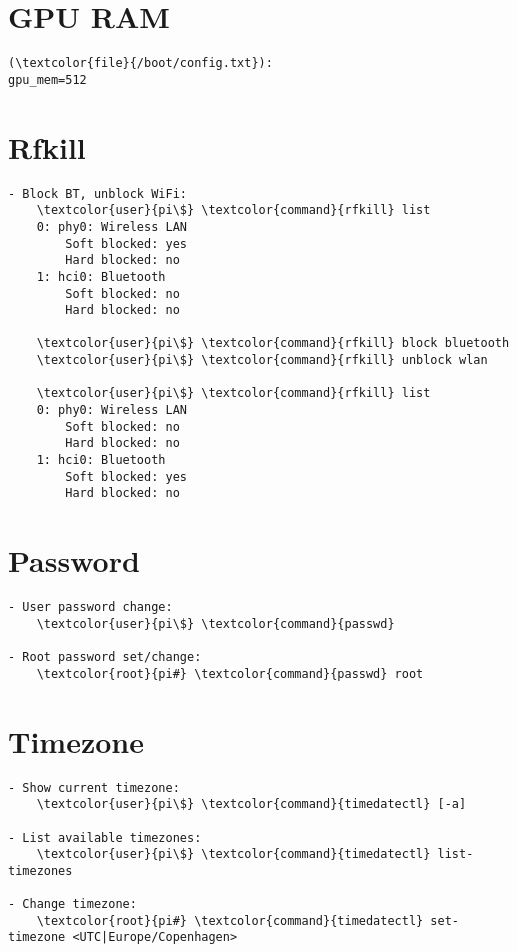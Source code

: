 \documentclass[10pt, a4paper, onecolumn, openany]{book} %
\begin{document}
\section{GPU RAM}
\begin{Verbatim}[commandchars=\\\{\}]
(\textcolor{file}{/boot/config.txt}):
gpu_mem=512
\end{Verbatim}
\section{Rfkill}
\begin{Verbatim}[commandchars=\\\{\}]
- Block BT, unblock WiFi:
    \textcolor{user}{pi\$} \textcolor{command}{rfkill} list
    0: phy0: Wireless LAN
        Soft blocked: yes
        Hard blocked: no
    1: hci0: Bluetooth
        Soft blocked: no
        Hard blocked: no
    
    \textcolor{user}{pi\$} \textcolor{command}{rfkill} block bluetooth
    \textcolor{user}{pi\$} \textcolor{command}{rfkill} unblock wlan

    \textcolor{user}{pi\$} \textcolor{command}{rfkill} list
    0: phy0: Wireless LAN
        Soft blocked: no
        Hard blocked: no
    1: hci0: Bluetooth
        Soft blocked: yes
        Hard blocked: no
\end{Verbatim}

\section{Password}
\begin{Verbatim}[commandchars=\\\{\}]
- User password change:
    \textcolor{user}{pi\$} \textcolor{command}{passwd}
   
- Root password set/change: 
    \textcolor{root}{pi#} \textcolor{command}{passwd} root
\end{Verbatim}

\section{Timezone}
\begin{Verbatim}[commandchars=\\\{\}]
- Show current timezone:
    \textcolor{user}{pi\$} \textcolor{command}{timedatectl} [-a]

- List available timezones:
    \textcolor{user}{pi\$} \textcolor{command}{timedatectl} list-timezones
    
- Change timezone:
    \textcolor{root}{pi#} \textcolor{command}{timedatectl} set-timezone <UTC|Europe/Copenhagen>
\end{Verbatim}
\end{document}
